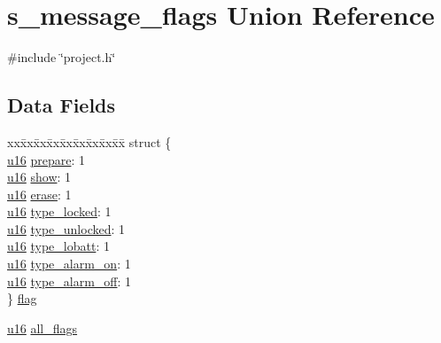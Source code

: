 \hypertarget{unions__message__flags}{\section{s\-\_\-message\-\_\-flags \-Union \-Reference}
\label{unions__message__flags}
}


{\ttfamily \#include \char`\"{}project.\-h\char`\"{}}

\subsection*{\-Data \-Fields}
\begin{DoxyCompactItemize}
\item 
\begin{tabbing}
xx\=xx\=xx\=xx\=xx\=xx\=xx\=xx\=xx\=\kill
struct \{\\
\>\hyperlink{main__ED__BM_8c_a9e6c91d77e24643b888dbd1a1a590054}{u16} \hyperlink{unions__message__flags_ac9fd816d2574fa72f3fbde01b771ed61}{prepare}: 1\\
\>\hyperlink{main__ED__BM_8c_a9e6c91d77e24643b888dbd1a1a590054}{u16} \hyperlink{unions__message__flags_a662267c93be643ec7a39b6fa293b81d3}{show}: 1\\
\>\hyperlink{main__ED__BM_8c_a9e6c91d77e24643b888dbd1a1a590054}{u16} \hyperlink{unions__message__flags_ada1ae3495f53243e7b5e0c42b23ea23e}{erase}: 1\\
\>\hyperlink{main__ED__BM_8c_a9e6c91d77e24643b888dbd1a1a590054}{u16} \hyperlink{unions__message__flags_ac13d4360deaf5e0a69a30a4b45ec42ed}{type\_locked}: 1\\
\>\hyperlink{main__ED__BM_8c_a9e6c91d77e24643b888dbd1a1a590054}{u16} \hyperlink{unions__message__flags_a4bfa5684da4ccc75b65c7f6929d6242a}{type\_unlocked}: 1\\
\>\hyperlink{main__ED__BM_8c_a9e6c91d77e24643b888dbd1a1a590054}{u16} \hyperlink{unions__message__flags_a579bae04b8fa524dba4e5c6902a42071}{type\_lobatt}: 1\\
\>\hyperlink{main__ED__BM_8c_a9e6c91d77e24643b888dbd1a1a590054}{u16} \hyperlink{unions__message__flags_a2faac326dab7d691e5572d1429bd3813}{type\_alarm\_on}: 1\\
\>\hyperlink{main__ED__BM_8c_a9e6c91d77e24643b888dbd1a1a590054}{u16} \hyperlink{unions__message__flags_adac1adf11f9f280429ff5f84f32a2431}{type\_alarm\_off}: 1\\
\} \hyperlink{unions__message__flags_afab2973bf2fba71ed2d5fced86bc2598}{flag}\\

\end{tabbing}\item 
\hyperlink{main__ED__BM_8c_a9e6c91d77e24643b888dbd1a1a590054}{u16} \hyperlink{unions__message__flags_abf876e68df8575f02084e137cc49266b}{all\-\_\-flags}
\end{DoxyCompactItemize}



